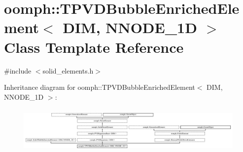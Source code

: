 \hypertarget{classoomph_1_1TPVDBubbleEnrichedElement}{}\section{oomph\+:\+:T\+P\+V\+D\+Bubble\+Enriched\+Element$<$ D\+IM, N\+N\+O\+D\+E\+\_\+1D $>$ Class Template Reference}
\label{classoomph_1_1TPVDBubbleEnrichedElement}


{\ttfamily \#include $<$solid\+\_\+elements.\+h$>$}

Inheritance diagram for oomph\+:\+:T\+P\+V\+D\+Bubble\+Enriched\+Element$<$ D\+IM, N\+N\+O\+D\+E\+\_\+1D $>$\+:\begin{figure}[H]
\begin{center}
\leavevmode
\includegraphics[height=2.359551cm]{classoomph_1_1TPVDBubbleEnrichedElement}
\end{center}
\end{figure}
